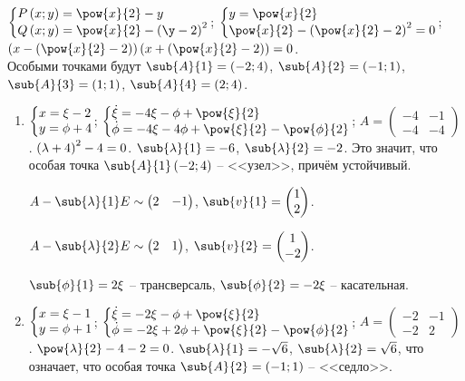 \documentclass[a5paper,10pt]{article}
\begin{document}
$\tsys{
    P\br{x; y} = \pow{x}{2} - y
    \\ Q\br{x; y} = \pow{x}{2} - \br{\y - 2}^2
}$;
$\tsys{
    y = \pow{x}{2}
    \\ \pow{x}{2} - \br{\pow{x}{2} - 2}^2 = 0
}$;
$\br{x - \br{\pow{x}{2} - 2}}\br{x + \br{\pow{x}{2} - 2}} = 0$. \\
Особыми точками будут 
$\sub{A}{1} = \br{-2; 4}$,
$\sub{A}{2} = \br{-1; 1}$,
$\sub{A}{3} = \br{1; 1}$,
$\sub{A}{4} = \br{2; 4}$.

\begin{enumerate}
    \item $\tsys{x = \xi - 2 \\ y = \phi + 4}$;
    $\tsys{
        \dot{\xi} = -4\xi - \phi + \pow{\xi}{2} \\
        \dot{\phi} = -4\xi - 4\phi + \pow{\xi}{2} - \pow{\phi}{2}
    }$;
    $A = \begin{pmatrix} -4 & -1 \\ -4 & -4 \end{pmatrix}$.
    $\left(\hspace{0.01em}\lambda + 4\hspace{0.01em}\right)^2 - 4 = 0$.
    $\sub{\lambda}{1} = -6$, $\sub{\lambda}{2} = -2$.
    Это значит, что особая точка $\sub{A}{1}\br{-2; 4}$ -- <<узел>>, причём устойчивый.
    
    $A - \sub{\lambda}{1} E \sim \begin{pmatrix} 2 & -1 \end{pmatrix}$,
    $\sub{v}{1} = \begin{pmatrix} 1 \\ 2 \end{pmatrix}$.
    
    $A - \sub{\lambda}{2} E \sim \begin{pmatrix} 2 & 1 \end{pmatrix}$,
    $\sub{v}{2} = \begin{pmatrix} 1 \\ -2 \end{pmatrix}$.
    
    $\sub{\phi}{1} = 2\xi$ -- трансверсаль, $\sub{\phi}{2} = -2\xi$ -- касательная.
    
    \item $\tsys{x = \xi - 1 \\ y = \phi + 1}$;
    $\tsys{
        \dot{\xi} = -2\xi - \phi + \pow{\xi}{2} \\
        \dot{\phi} = -2\xi + 2\phi + \pow{\xi}{2} - \pow{\phi}{2}
    }$;
    $A = \begin{pmatrix} -2 & -1 \\ -2 & 2 \end{pmatrix}$.
    $\pow{\lambda}{2} - 4 - 2 = 0$.
    $\sub{\lambda}{1} = -\sqrt{6}$,
    $\sub{\lambda}{2} = \sqrt{6}$,
    что означает, что особая точка $\sub{A}{2} = \br{-1; 1}$ -- <<седло>>.
    

\end{enumerate}
\end{document}
